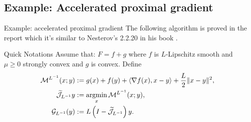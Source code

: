 \documentclass[11pt]{beamer}
\begin{document}
    \subsection{Example: Accelerated proximal gradient}
        \begin{frame}{Example: accelerated proximal gradient}
            The following algorithm is proved in the report which it's similar to Nesterov's 2.2.20 in his book \cite{nesterov_lectures_2018}. 
            \begin{block}{Quick Notations}
                Assume that: $F = f + g$ where $f$ is $L$-Lipschitz smooth and $\mu \ge 0$ strongly convex and $g$ is convex. 
                Define 
                \begin{align*}
                    \mathcal M^{L^{-1}}(x; y) 
                    &:= g(x) + f(y) 
                    + 
                    \left\langle \nabla f(x), x - y\right\rangle 
                    + 
                    \frac{L}{2}\Vert x - y\Vert^2, 
                    \\
                    \widetilde{\mathcal J}_{L^{-1}}y 
                    &:= \mathop{\rm argmin}\limits_{x} \mathcal M^{L^{-1}}(x; y), 
                    \\
                    \mathcal G_{L^{-1}}(y)
                    &:= L\left(I - \widetilde{\mathcal J}_{L^{-1}}\right)y. 
                \end{align*}
            \end{block}
        \end{frame}
\end{document}
